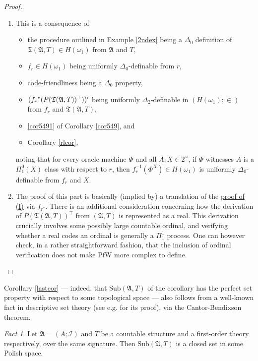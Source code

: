 \documentclass[12pt, twoside]{memoir}
\numberwithin{equation}{section}
\theoremstyle{definition}
\theoremstyle{remark}
\newtheorem{fact}[thm]{Fact}
\theoremstyle{definition}
\theoremstyle{definition}
\theoremstyle{definition}
\theoremstyle{remark}
\begin{document}
\begin{proof}
\leavevmode
\begin{enumerate}[label=(\Roman*)]
    \item\label{6330ip} This is a consequence of
    \begin{itemize}
        \item the procedure outlined in Example \ref{2ndex} being a $\Delta_0$ definition of $\mathfrak{T}(\mathfrak{A}, T) \in H(\omega_1)$ from $\mathfrak{A}$ and $T$,
        \item $f_r \in H(\omega_1)$ being uniformly $\Delta_0$-definable from $r$,
        \item code-friendliness being a $\Delta_0$ property,
        \item $(f_r" (P(\mathfrak{T}(\mathfrak{A}, T))^{\top}))'$ being uniformly $\Delta_2$-definable in $(H(\omega_1); \in)$ from $f_r$ and $\mathfrak{T}(\mathfrak{A}, T)$, 
        \item \ref{cor5491} of Corollary \ref{cor549}, and
        \item Corollary \ref{rlcor},
    \end{itemize}
    noting that for every oracle machine $\Phi$ and all $A, X \in 2^{\omega}$, if $\Phi$ witnesses $A$ is a $\Pi^0_1(X)$ class with respect to $r$, then $f_r^{-1}(\Phi^X) \in H(\omega_1)$ is uniformly $\Delta_0$-definable from $f_r$ and $X$.
    \item The proof of this part is basically (implied by) a translation of the \hyperref[6330ip]{proof of (I)} via $f_{r^*}$. There is an additional consideration concerning how the derivation of $P(\mathfrak{T}(\mathfrak{A}, T))^{\top}$ from $(\mathfrak{A}, T)$ is represented as a real. This derivation crucially involves some possibly large countable ordinal, and verifying whether a real codes an ordinal is generally a $\Pi^1_1$ process. One can however check, in a rather straightforward fashion, that the inclusion of ordinal verification does not make $\mathrm{PfW}$ more complex to define. \qedhere
\end{enumerate}
\end{proof}

Corollary \ref{lastcor} --- indeed, that $\mathrm{Sub}(\mathfrak{A}, T)$ of the corollary has the perfect set property with respect to some topological space --- also follows from a well-known fact in descriptive set theory (see e.g. \cite{kechris} for its proof), via the Cantor-Bendixson theorem. 

\begin{fact}\label{lastfact}
Let $\mathfrak{A} = (A; \mathcal{I})$ and $T$ be a countable structure and a first-order theory respectively, over the same signature. Then $\mathrm{Sub}(\mathfrak{A}, T)$ is a closed set in some Polish space.
\end{fact}
\end{document}
